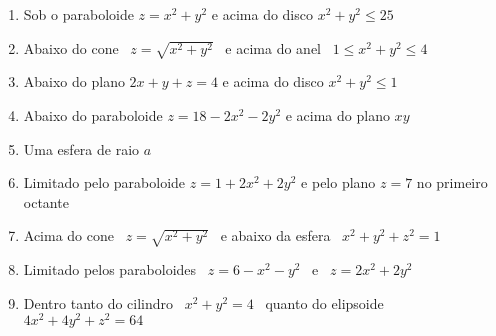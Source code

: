 \documentclass[a4paper, 12pt]{article}
\begin{document}
	\begin{enumerate}[resume]
	
		\item Sob o paraboloide $z = x^2 + y^2$ e acima do disco $x^2 + y^2 \leq 25$
		
		\item Abaixo do cone \, $z = \sqrt{x^2 + y^2}$ \, e acima do anel \, $1 \leq x^2 + y^2 \leq 4$
		
		\item Abaixo do plano $2x + y + z = 4$ e acima do disco $x^2 + y^2 \leq 1$
		\resposta{$4\pi$}
		
		\item Abaixo do paraboloide $z = 18 - 2x^2 - 2y^2$ e acima do plano $xy$
		\resposta{$81\pi$}
		
		\item Uma esfera de raio $a$
		
		\item Limitado pelo paraboloide $z = 1 + 2x^2 + 2y^2$ e pelo plano $z = 7$ no primeiro octante \\
		
		\item Acima do cone \, $z = \sqrt{x^2 + y^2}$ \, e abaixo da esfera \, $x^2 + y^2 + z^2 = 1$
		
		\item Limitado pelos paraboloides \, $z = 6 - x^2 - y^2$ \, e \, $z = 2x^2 + 2y^2$
		\resposta{$6\pi$}
		
		\item Dentro tanto do cilindro \, $x^2 + y^2 = 4$ \, quanto do elipsoide \, $4x^2 + 4y^2 + z^2 = 64$ \\
	
	\end{enumerate}
			
	\vspace{5mm}	
	
\end{document}
